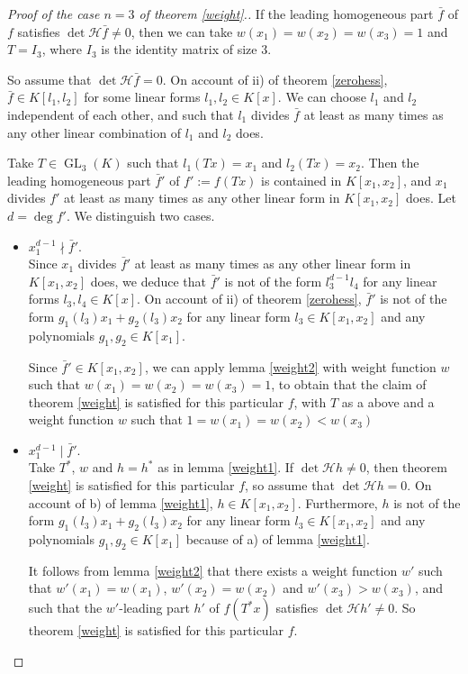 \documentclass[10pt]{article}
\theoremstyle{remark}
\theoremstyle{definition}
\newcommand{\hess}{{\mathcal H}}
\newcommand{\GL}{\operatorname{GL}}
\begin{document}
\begin{proof}[Proof of the case $n=3$ of theorem \ref{weight}.]
If the leading homogeneous part $\bar{f}$ of $f$ satisfies $\det \hess \bar{f} \ne 0$,
then we can take $w(x_1) = w(x_2) = w(x_3) = 1$ and $T = I_3$, where $I_3$ is the identity 
matrix of size $3$.

So assume that $\det \hess \bar{f} = 0$. On account of ii) of theorem \ref{zerohess},
$\bar{f} \in K[l_1,l_2]$ for some linear forms $l_1, l_2 \in K[x]$. We can choose
$l_1$ and $l_2$ independent of each other, and such that $l_1$ divides $\bar{f}$ at 
least as many times as any other linear combination of $l_1$ and $l_2$ does.

Take $T \in \GL_3(K)$ such that $l_1(Tx) = x_1$ and $l_2(Tx) = x_2$. Then the leading
homogeneous part $\bar{f}'$ of $f' := f(Tx)$ is contained in $K[x_1,x_2]$, and
$x_1$ divides $f'$ at least as many times as any other linear form in $K[x_1,x_2]$ does.
Let $d = \deg f'$. We distinguish two cases.
\begin{itemize}

\item $x_1^{d-1} \nmid \bar{f}'$. \\
Since $x_1$ divides $\bar{f}'$ at least as many times as any other linear form in $K[x_1,x_2]$ does,
we deduce that $\bar{f}'$ is not of the form $l_3^{d-1} l_4$ for any linear forms $l_3, l_4 \in K[x]$.
On account of ii) of theorem \ref{zerohess}, $\bar{f}'$ is not of the form 
$g_1(l_3) x_1 + g_2(l_3) x_2$ for any linear form $l_3 \in K[x_1,x_2]$
and any polynomials $g_1, g_2 \in K[x_1]$. 

Since $\bar{f}' \in K[x_1,x_2]$, we can apply lemma \ref{weight2}
with weight function $w$ such that $w(x_1) = w(x_2) = w(x_3) = 1$, to obtain
that the claim of theorem \ref{weight} is satisfied for this particular $f$, with $T$ as a above
and a weight function $w$ such that $1 = w(x_1) = w(x_2) < w(x_3)$

\item $x_1^{d-1} \mid \bar{f}'$. \\
Take $T^{*}$, $w$ and $h = h^{*}$ as in lemma \ref{weight1}. If $\det \hess h \ne 0$, then theorem
\ref{weight} is satisfied for this particular $f$, so assume that $\det \hess h = 0$. On account of
b) of lemma \ref{weight1}, $h \in K[x_1,x_2]$. Furthermore, $h$ is not of the form 
$g_1(l_3) x_1 + g_2(l_3) x_2$ for any linear form $l_3 \in K[x_1,x_2]$ and any polynomials 
$g_1, g_2 \in K[x_1]$ because of a) of lemma \ref{weight1}.

It follows from lemma \ref{weight2} that there
exists a weight function $w'$ such that $w'(x_1) = w(x_1)$, $w'(x_2) = w(x_2)$ and
$w'(x_3) > w(x_3)$, and such that the $w'$-leading part $h'$ of $f(T^{*}x)$ satisfies 
$\det \hess h' \ne 0$. So theorem \ref{weight} is satisfied for this particular $f$. \qedhere

\end{itemize}
\end{proof}
\end{document}

